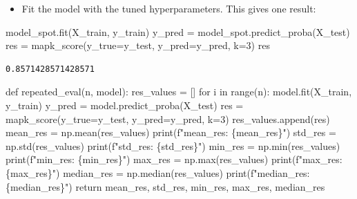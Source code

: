 \documentclass[
  letterpaper,
  DIV=11,
  numbers=noendperiod]{scrreprt}
\newenvironment{Shaded}{\begin{snugshade}}{\end{snugshade}}
\newcommand{\BuiltInTok}[1]{\textcolor[rgb]{0.00,0.23,0.31}{#1}}
\newcommand{\ControlFlowTok}[1]{\textcolor[rgb]{0.00,0.23,0.31}{#1}}
\newcommand{\DecValTok}[1]{\textcolor[rgb]{0.68,0.00,0.00}{#1}}
\newcommand{\KeywordTok}[1]{\textcolor[rgb]{0.00,0.23,0.31}{#1}}
\newcommand{\NormalTok}[1]{\textcolor[rgb]{0.00,0.23,0.31}{#1}}
\newcommand{\OperatorTok}[1]{\textcolor[rgb]{0.37,0.37,0.37}{#1}}
\newcommand{\SpecialCharTok}[1]{\textcolor[rgb]{0.37,0.37,0.37}{#1}}
\newcommand{\SpecialStringTok}[1]{\textcolor[rgb]{0.13,0.47,0.30}{#1}}
\providecommand{\tightlist}{%
  \setlength{\itemsep}{0pt}\setlength{\parskip}{0pt}}\usepackage{longtable,booktabs,array}
\begin{document}
\begin{itemize}
\tightlist
\item
  Fit the model with the tuned hyperparameters. This gives one result:
\end{itemize}

\begin{Shaded}
\begin{Highlighting}[]
\NormalTok{model\_spot.fit(X\_train, y\_train)}
\NormalTok{y\_pred }\OperatorTok{=}\NormalTok{ model\_spot.predict\_proba(X\_test)}
\NormalTok{res }\OperatorTok{=}\NormalTok{ mapk\_score(y\_true}\OperatorTok{=}\NormalTok{y\_test, y\_pred}\OperatorTok{=}\NormalTok{y\_pred, k}\OperatorTok{=}\DecValTok{3}\NormalTok{)}
\NormalTok{res}
\end{Highlighting}
\end{Shaded}

\begin{verbatim}
0.8571428571428571
\end{verbatim}

\begin{Shaded}
\begin{Highlighting}[]
\KeywordTok{def}\NormalTok{ repeated\_eval(n, model):}
\NormalTok{    res\_values }\OperatorTok{=}\NormalTok{ []}
    \ControlFlowTok{for}\NormalTok{ i }\KeywordTok{in} \BuiltInTok{range}\NormalTok{(n):}
\NormalTok{        model.fit(X\_train, y\_train)}
\NormalTok{        y\_pred }\OperatorTok{=}\NormalTok{ model.predict\_proba(X\_test)}
\NormalTok{        res }\OperatorTok{=}\NormalTok{ mapk\_score(y\_true}\OperatorTok{=}\NormalTok{y\_test, y\_pred}\OperatorTok{=}\NormalTok{y\_pred, k}\OperatorTok{=}\DecValTok{3}\NormalTok{)}
\NormalTok{        res\_values.append(res)}
\NormalTok{    mean\_res }\OperatorTok{=}\NormalTok{ np.mean(res\_values)}
    \BuiltInTok{print}\NormalTok{(}\SpecialStringTok{f"mean\_res: }\SpecialCharTok{\{}\NormalTok{mean\_res}\SpecialCharTok{\}}\SpecialStringTok{"}\NormalTok{)}
\NormalTok{    std\_res }\OperatorTok{=}\NormalTok{ np.std(res\_values)}
    \BuiltInTok{print}\NormalTok{(}\SpecialStringTok{f"std\_res: }\SpecialCharTok{\{}\NormalTok{std\_res}\SpecialCharTok{\}}\SpecialStringTok{"}\NormalTok{)}
\NormalTok{    min\_res }\OperatorTok{=}\NormalTok{ np.}\BuiltInTok{min}\NormalTok{(res\_values)}
    \BuiltInTok{print}\NormalTok{(}\SpecialStringTok{f"min\_res: }\SpecialCharTok{\{}\NormalTok{min\_res}\SpecialCharTok{\}}\SpecialStringTok{"}\NormalTok{)}
\NormalTok{    max\_res }\OperatorTok{=}\NormalTok{ np.}\BuiltInTok{max}\NormalTok{(res\_values)}
    \BuiltInTok{print}\NormalTok{(}\SpecialStringTok{f"max\_res: }\SpecialCharTok{\{}\NormalTok{max\_res}\SpecialCharTok{\}}\SpecialStringTok{"}\NormalTok{)}
\NormalTok{    median\_res }\OperatorTok{=}\NormalTok{ np.median(res\_values)}
    \BuiltInTok{print}\NormalTok{(}\SpecialStringTok{f"median\_res: }\SpecialCharTok{\{}\NormalTok{median\_res}\SpecialCharTok{\}}\SpecialStringTok{"}\NormalTok{)}
    \ControlFlowTok{return}\NormalTok{ mean\_res, std\_res, min\_res, max\_res, median\_res}
\end{Highlighting}
\end{Shaded}
\end{document}
